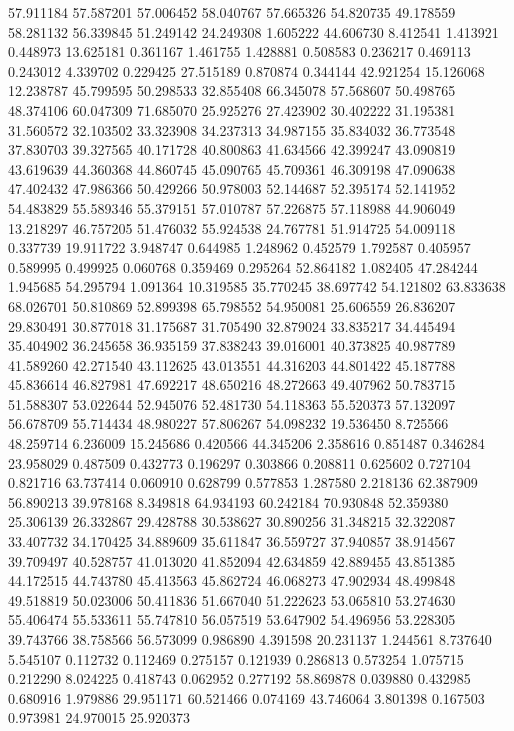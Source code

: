 57.911184
57.587201
57.006452
58.040767
57.665326
54.820735
49.178559
58.281132
56.339845
51.249142
24.249308
1.605222
44.606730
8.412541
1.413921
0.448973
13.625181
0.361167
1.461755
1.428881
0.508583
0.236217
0.469113
0.243012
4.339702
0.229425
27.515189
0.870874
0.344144
42.921254
15.126068
12.238787
45.799595
50.298533
32.855408
66.345078
57.568607
50.498765
48.374106
60.047309
71.685070
25.925276
27.423902
30.402222
31.195381
31.560572
32.103502
33.323908
34.237313
34.987155
35.834032
36.773548
37.830703
39.327565
40.171728
40.800863
41.634566
42.399247
43.090819
43.619639
44.360368
44.860745
45.090765
45.709361
46.309198
47.090638
47.402432
47.986366
50.429266
50.978003
52.144687
52.395174
52.141952
54.483829
55.589346
55.379151
57.010787
57.226875
57.118988
44.906049
13.218297
46.757205
51.476032
55.924538
24.767781
51.914725
54.009118
0.337739
19.911722
3.948747
0.644985
1.248962
0.452579
1.792587
0.405957
0.589995
0.499925
0.060768
0.359469
0.295264
52.864182
1.082405
47.284244
1.945685
54.295794
1.091364
10.319585
35.770245
38.697742
54.121802
63.833638
68.026701
50.810869
52.899398
65.798552
54.950081
25.606559
26.836207
29.830491
30.877018
31.175687
31.705490
32.879024
33.835217
34.445494
35.404902
36.245658
36.935159
37.838243
39.016001
40.373825
40.987789
41.589260
42.271540
43.112625
43.013551
44.316203
44.801422
45.187788
45.836614
46.827981
47.692217
48.650216
48.272663
49.407962
50.783715
51.588307
53.022644
52.945076
52.481730
54.118363
55.520373
57.132097
56.678709
55.714434
48.980227
57.806267
54.098232
19.536450
8.725566
48.259714
6.236009
15.245686
0.420566
44.345206
2.358616
0.851487
0.346284
23.958029
0.487509
0.432773
0.196297
0.303866
0.208811
0.625602
0.727104
0.821716
63.737414
0.060910
0.628799
0.577853
1.287580
2.218136
62.387909
56.890213
39.978168
8.349818
64.934193
60.242184
70.930848
52.359380
25.306139
26.332867
29.428788
30.538627
30.890256
31.348215
32.322087
33.407732
34.170425
34.889609
35.611847
36.559727
37.940857
38.914567
39.709497
40.528757
41.013020
41.852094
42.634859
42.889455
43.851385
44.172515
44.743780
45.413563
45.862724
46.068273
47.902934
48.499848
49.518819
50.023006
50.411836
51.667040
51.222623
53.065810
53.274630
55.406474
55.533611
55.747810
56.057519
53.647902
54.496956
53.228305
39.743766
38.758566
56.573099
0.986890
4.391598
20.231137
1.244561
8.737640
5.545107
0.112732
0.112469
0.275157
0.121939
0.286813
0.573254
1.075715
0.212290
8.024225
0.418743
0.062952
0.277192
58.869878
0.039880
0.432985
0.680916
1.979886
29.951171
60.521466
0.074169
43.746064
3.801398
0.167503
0.973981
24.970015
25.920373
